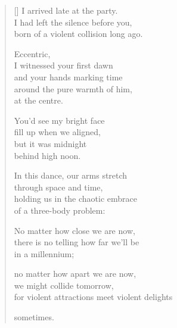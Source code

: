 \documentclass[12pt,a4paper]{article}
\begin{document}
\thispagestyle{empty}


\settowidth{\versewidth}{for violent attractions meet violent delights}

\bigskip

\begin{verse}[\versewidth]
  I arrived late at the party. \\
  I had left the silence before you, \\
  born of a violent collision long ago.

  Eccentric, \\
  I witnessed your first dawn \\
  and your hands marking time \\
  around the pure warmth of him, \\
  at the centre.

  You'd see my bright face \\
  fill up when we aligned, \\
  but it was midnight \\
  behind high noon.

  In this dance, our arms stretch \\
  through space and time, \\
  holding us in the chaotic embrace \\
  of a three-body problem:

  No matter how close we are now, \\
  there is no telling how far we'll be \\
  in a millennium;

  no matter how apart we are now, \\
  we might collide tomorrow, \\
  for violent attractions meet violent delights

  sometimes.
\end{verse}
\end{document}
